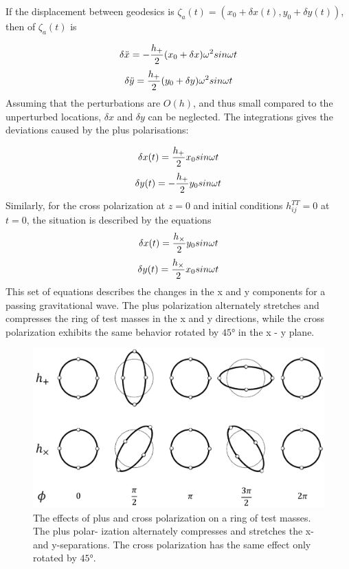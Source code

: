 \documentclass[binding=0.6cm, LaM]{sapthesis}
\begin{document}
If the displacement between geodesics is $\zeta_a (t) = (x_0 + \delta x(t), y_0 + \delta y(t))$, then of $\zeta_a (t)$ is 

\begin{equation}
\delta {\ddot x} = - {{h_{+}} \over 2} (x_0 + \delta x) \omega ^2 sin \omega t
\end{equation}
\begin{equation}
\delta {\ddot y} =  {{h_{+}} \over 2} (y_0 + \delta y) \omega ^2 sin \omega t
\end{equation}
Assuming that the perturbations are $O(h)$, and thus small compared to the unperturbed locations, $\delta x$ and $\delta y$ can be neglected.
The integrations gives the deviations caused by the plus polarisations:

\begin{equation}
\delta x(t) =  {{h_{+}} \over 2} x_0 sin \omega t
\end{equation}
\begin{equation}
\delta y(t) = - {{h_{+}} \over 2} y_0  sin \omega t
\end{equation}
Similarly, for the cross polarization at $z=0$ and initial conditions $h_{ij}^{TT} = 0$ at $t= 0$, the situation is described by the equations
\begin{equation}
\delta x(t) =  {{h_{\times}} \over 2} y_0 sin \omega t
\end{equation}
\begin{equation}
\delta y(t) =  {{h_{\times}} \over 2} x_0  sin \omega t
\end{equation}
This set of equations describes the changes in the x and y components for a passing gravitational wave. The plus polarization alternately stretches and compresses the ring of test masses in the x and y directions, while the cross polarization exhibits the same behavior rotated by $\ang{45}$ in the x - y plane. 

\begin{figure}
\includegraphics[scale=1]{ring}
\centering
\caption{The effects of plus and cross polarization on a ring of test masses. The plus polar- ization alternately compresses and stretches the x- and y-separations. The cross polarization has the same effect only rotated by  $\ang{45}$.}
\label{fig:ring}
\end{figure}
\end{document}
